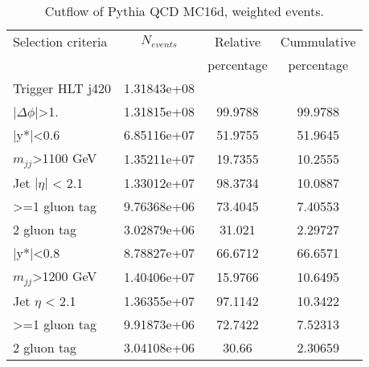\begin{table}[ht]
\begin{center}
\begin{tabular}{|l|c|c|c|}
\hline
Selection criteria & $N_{events}$ & Relative & Cummulative  \\
 & & percentage & percentage \\
\hline
Trigger HLT j420 & 1.31843e+08 &  &  \\
$|\Delta\phi|$>1. & 1.31815e+08 & 99.9788 & 99.9788 \\
\hline\hline
|y*|<0.6 & 6.85116e+07 & 51.9755 & 51.9645 \\
$m_{jj}$>1100 GeV & 1.35211e+07 & 19.7355 & 10.2555 \\
Jet $|\eta|$ < 2.1 & 1.33012e+07 & 98.3734 & 10.0887 \\
>=1 gluon tag & 9.76368e+06 & 73.4045 & 7.40553 \\
2 gluon tag & 3.02879e+06 & 31.021 & 2.29727 \\
\hline\hline
|y*|<0.8 & 8.78827e+07 & 66.6712 & 66.6571 \\
$m_{jj}$>1200 GeV & 1.40406e+07 & 15.9766 & 10.6495 \\
Jet $\eta$ < 2.1 & 1.36355e+07 & 97.1142 & 10.3422 \\
>=1 gluon tag & 9.91873e+06 & 72.7422 & 7.52313 \\
2 gluon tag & 3.04108e+06 & 30.66 & 2.30659 \\
\hline
\end{tabular}
\end{center}
\caption{Cutflow of Pythia QCD MC16d, weighted events.}
\label{tab:bckgdcutflowMC16dWeighted}
\end{table}


